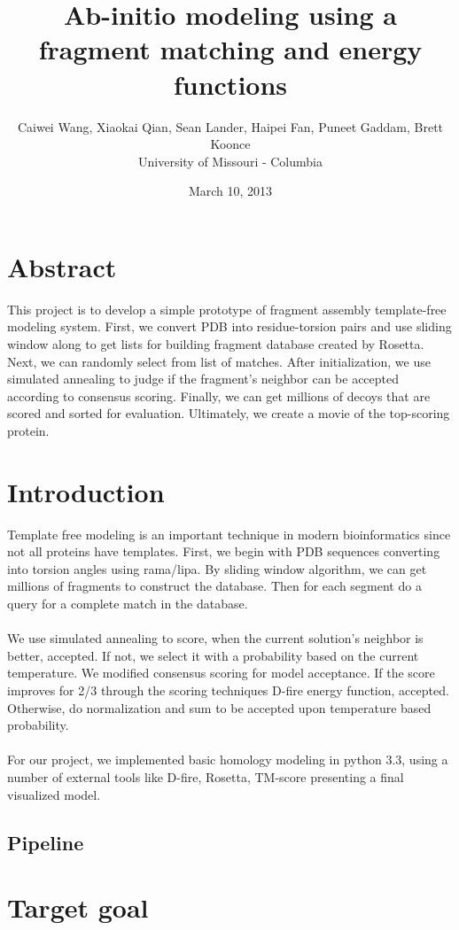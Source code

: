 \documentclass{article}
\title{Ab-initio modeling using a fragment matching and energy functions}
\author{Caiwei Wang, Xiaokai Qian, Sean Lander, Haipei Fan, Puneet Gaddam, Brett Koonce\\University of Missouri - Columbia}
\date{March 10, 2013}
\begin{document}
\maketitle

\section{Abstract}
This project is to develop a simple prototype of fragment assembly template-free modeling system. First, we convert PDB into residue-torsion pairs and use sliding window along to get lists for building fragment database created by Rosetta. Next, we can randomly select from list of matches. After initialization, we use simulated annealing to judge if the fragment’s neighbor can be accepted according to consensus scoring. Finally, we can get millions of decoys that are scored and sorted for evaluation. Ultimately, we create a movie of the top-scoring protein.

\section{Introduction}

Template free modeling is an important technique in modern bioinformatics since not all proteins have templates. First, we begin with PDB sequences converting into torsion angles using rama/lipa. By sliding window algorithm, we can get millions of fragments to construct the database. Then for each segment do a query for a complete match in the database.\\\\
We use simulated annealing to score, when the current solution’s neighbor is better, accepted. If not, we select it with a probability based on the current temperature. We modified consensus scoring for model acceptance. If the score improves for 2/3 through the scoring techniques D-fire energy function, accepted. Otherwise, do normalization and sum to be accepted upon temperature based probability.\\\\
For our project, we implemented basic homology modeling in python 3.3, using a number of external tools like D-fire, Rosetta, TM-score presenting a final visualized model.


\subsection{Pipeline}


\section{Target goal}
\end{document}
